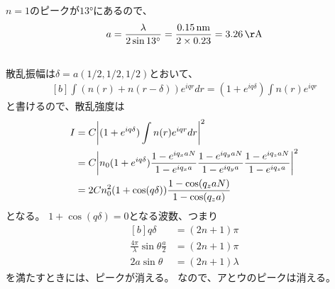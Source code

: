 \documentclass[../../sp_2017.tex]{subfiles}
\begin{document}
\subsection{}
\(n=1\)のピークが\(\ang{13}\)にあるので、
\begin{equation}\begin{aligned}[b]
    a = \frac{\lambda}{2\sin\ang{13}}= \frac{0.15\,\si{nm}}{2\times0.23}=3.26\,\si{\AA}
\end{aligned}\end{equation}

\subsection{}
散乱振幅は\(\delta=a(1/2,1/2,1/2)\)とおいて、
\begin{equation}\begin{aligned}[b]
    \int (n(r)+n(r-\delta))e^{iqr}dr = (1+e^{iq\delta})\int n(r)e^{iqr}
\end{aligned}\end{equation}
と書けるので、散乱強度は
\begin{equation}\begin{aligned}[b]
    I &= C\abs{(1+e^{iq\delta})\int n(r)e^{iqr}dr}^2\\
    &= C\abs{n_0(1+e^{iq\delta})\frac{1-e^{iq_xaN}}{1-e^{iq_xa}}\frac{1-e^{iq_yaN}}{1-e^{iq_ya}}\frac{1-e^{iq_zaN}}{1-e^{iq_za}}}^2\\
    &= 2Cn_0^2(1+\cos(q\delta))\frac{1-\cos(q_zaN)}{1-\cos(q_za)}
\end{aligned}\end{equation}
となる。
\(1+\cos(q\delta)=0\)となる波数、つまり
\begin{equation}\begin{aligned}[b]
    q\delta &= (2n+1)\pi\\
    \frac{4\pi}{\lambda}\sin\theta \frac{a}{2} &= (2n+1)\pi\\
    2a\sin\theta &= (2n+1)\lambda
\end{aligned}\end{equation}
を満たすときには、ピークが消える。
なので、アとウのピークは消える。
\end{document}
